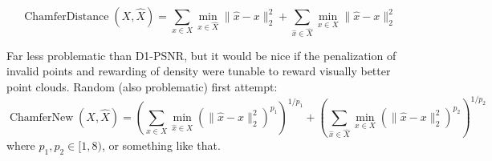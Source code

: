 \documentclass[12pt]{extarticle}
\begin{document}
\noindent
\hrulefill

\[
  \operatorname{ChamferDistance}(X, \hat{X})
  = \sum_{x \in X} \min_{\hat{x} \in \hat{X}} \lVert \hat{x} - x \rVert_2^2
  + \sum_{\hat{x} \in \hat{X}} \min_{x \in X} \lVert \hat{x} - x \rVert_2^2
\]

Far less problematic than D1-PSNR, but it would be nice if the penalization of invalid points and rewarding of density were tunable to reward visually better point clouds. Random (also problematic) first attempt:
%
\[
  \operatorname{ChamferNew}(X, \hat{X})
  = \left(
  \sum_{x \in X} \min_{\hat{x} \in \hat{X}} (\lVert \hat{x} - x \rVert_2^2)^{p_1}
  \right)^{1/p_1}
  + \left(
    \sum_{\hat{x} \in \hat{X}} \min_{x \in X} (\lVert \hat{x} - x \rVert_2^2)^{p_2}
  \right)^{1/p_2}
\]
%
where $p_1, p_2 \in [1, 8)$, or something like that.

\hrulefill
\end{document}
